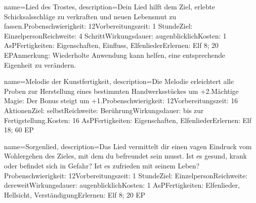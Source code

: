 {
    name={Lied des Trostes},
    description={Dein Lied hilft dem Ziel, erlebte Schicksalsschläge zu verkraften und neuen Lebensmut zu fassen.\newline Probenschwierigkeit: 12\newline Vorbereitungszeit: 1 Stunde\newline Ziel: Einzelperson\newline Reichweite: 4 Schritt\newline Wirkungsdauer: augenblicklich\newline Kosten: 1 AsP\newline Fertigkeiten: Eigenschaften, Einfluss, Elfenlieder\newline Erlernen: Elf 8; 20 EP\newline Anmerkung: Wiederholte Anwendung kann helfen, eine entsprechende Eigenheit zu verändern.}
}


{
    name={Melodie der Kunstfertigkeit},
    description={Die Melodie erleichtert alle Proben zur Herstellung eines bestimmten Handwerksstückes um +2.\newline Mächtige Magie: Der Bonus steigt um +1.\newline Probenschwierigkeit: 12\newline Vorbereitungszeit: 16 Aktionen\newline Ziel: selbst\newline Reichweite: Berührung\newline Wirkungsdauer: bis zur Fertigstellung.\newline Kosten: 16 AsP\newline Fertigkeiten: Eigenschaften, Elfenlieder\newline Erlernen: Elf 18; 60 EP}
}


{
    name={Sorgenlied},
    description={Das Lied vermittelt dir einen vagen Eindruck vom Wohlergehen des Zieles, mit dem du befreundet sein musst. Ist es gesund, krank oder befindet sich in Gefahr? Ist es zufrieden mit seinem Leben?\newline Probenschwierigkeit: 12\newline Vorbereitungszeit: 1 Stunde\newline Ziel: Einzelperson\newline Reichweite: dereweit\newline Wirkungsdauer: augenblicklich\newline Kosten: 1 AsP\newline Fertigkeiten: Elfenlieder, Hellsicht, Verständigung\newline Erlernen: Elf 8; 20 EP}
}


